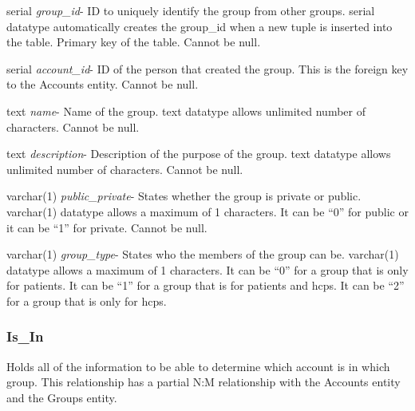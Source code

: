 \begin{description}
\item serial \textit{group\_id}-  ID to uniquely identify the group from other groups. serial datatype automatically creates the group\_id when a new tuple is inserted into the table.  Primary key of the table.  Cannot be null.
\item serial \textit{account\_id}- ID of the person that created the group.  This is the foreign key to the Accounts entity.  Cannot be null.
\item text \textit{name}- Name of the group.  text datatype allows unlimited number of characters.  Cannot be null.
\item text \textit{description}- Description of the purpose of the group.  text datatype allows unlimited number of characters.  Cannot be null.
\item varchar(1) \textit{public\_private}-  States whether the group is private or public.  varchar(1) datatype allows a maximum of 1 characters. It can be ``0'' for public or it can be ``1'' for private.  Cannot be null.

\item varchar(1) \textit{group\_type}- States who the members of the group can be.   varchar(1) datatype allows a maximum of 1 characters.  It can be ``0'' for a group that is only for patients.  It can be ``1'' for a group that is for patients and hcps.  It can be ``2'' for a group that is only for hcps.
\end{description}

\subsubsection{Is\_In}
Holds all of the information to be able to determine which account is in which group.  This relationship has a partial N:M relationship with the Accounts entity and the Groups entity.

